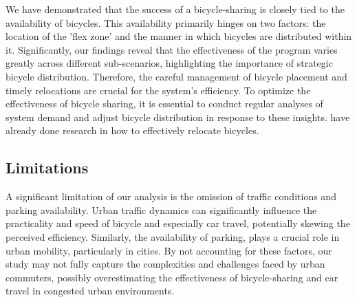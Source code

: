 We have demonstrated that the success of a bicycle-sharing is closely tied to the availability of bicycles.
This availability primarily hinges on two factors: the location of the 'flex zone' and the manner in which bicycles are distributed within it.
Significantly, our findings reveal that the effectiveness of the program varies greatly across different sub-scenarios, highlighting the importance of strategic bicycle distribution.
Therefore, the careful management of bicycle placement and timely relocations are crucial for the system's efficiency.
To optimize the effectiveness of bicycle sharing, it is essential to conduct regular analyses of system demand and adjust bicycle distribution in response to these insights.
\cite{heRobustRepositioningVehicle2020,luOptimizingProfitabilityQuality2018b,benjaafarDynamicInventoryRepositioning2018a} have already done research in how to effectively relocate bicycles.




\subsection{Limitations}
\label{sec:limitations}



A significant limitation of our analysis is the omission of traffic conditions and parking availability. 
Urban traffic dynamics can significantly influence the practicality and speed of bicycle and especially car travel, potentially skewing the perceived efficiency.
Similarly, the availability of parking, plays a crucial role in urban mobility, particularly in cities.
By not accounting for these factors, our study may not fully capture the complexities and challenges faced by urban commuters, possibly overestimating the effectiveness of bicycle-sharing and car travel in congested urban environments.

